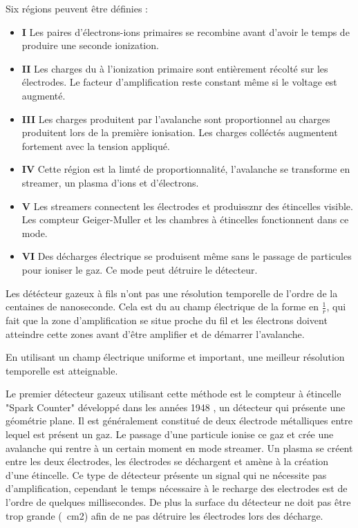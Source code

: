 Six régions peuvent être définies :

\begin{itemize}
	\item \textbf{I} Les paires d'électrons-ions primaires se recombine avant d'avoir le temps de produire une seconde ionization.
	\item \textbf{II} Les charges du à l'ionization primaire sont entièrement récolté sur les électrodes. Le facteur d'amplification reste constant même si le voltage est augmenté.
	\item \textbf{III} Les charges produitent par l'avalanche sont proportionnel au charges produitent lors de la première ionisation. Les charges colléctés augmentent fortement avec la tension appliqué.
	\item \textbf{IV} Cette région est la limté de proportionnalité, l'avalanche se transforme en streamer, un plasma d'ions et d'électrons.
	\item \textbf{V} Les streamers connectent les électrodes et produissznr des étincelles visible. Les compteur Geiger-Muller et les chambres à étincelles fonctionnent dans ce mode.
	\item \textbf{VI} Des décharges électrique se produisent même sans le passage de particules pour ioniser le gaz. Ce mode peut détruire le détecteur.
\end{itemize}

Les détécteur gazeux à fils n'ont pas une résolution temporelle de l'ordre de la centaines de nanoseconde. Cela est du au champ électrique de la forme en $\frac{1}{r}$, qui fait que la zone d'amplification se situe proche du fil et les électrons doivent atteindre cette zones avant d'être amplifier et de démarrer l'avalanche.

En utilisant un champ électrique uniforme et important, une meilleur résolution temporelle est atteignable.

Le premier détecteur gazeux utilisant cette méthode est le compteur à étincelle "Spark Counter" développé dans les années 1948 , un détecteur qui présente une géométrie plane. Il est généralement constitué de deux électrode métalliques entre lequel est présent un gaz. Le passage d'une particule ionise ce gaz et crée une avalanche qui rentre à un certain moment en mode streamer. Un plasma se créent entre les deux électrodes, les électrodes se déchargent et amène à la création d'une étincelle. Ce type de détecteur présente un signal qui ne nécessite pas d'amplification, cependant le temps nécessaire à le recharge des electrodes est de l'ordre de quelques millisecondes. De plus la surface du détecteur ne doit pas être trop grande (~cm2) afin de ne pas détruire les électrodes lors des décharge.

